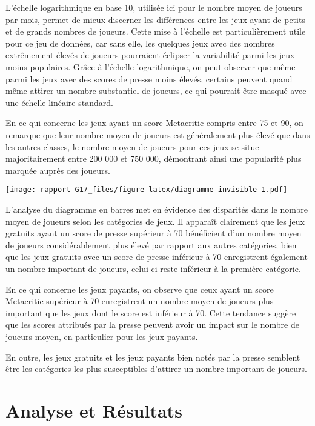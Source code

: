 \documentclass[mstat,12pt]{unswthesis}
\begin{document}
L'échelle logarithmique en base 10, utilisée ici pour le nombre moyen de
joueurs par mois, permet de mieux discerner les différences entre les
jeux ayant de petits et de grands nombres de joueurs. Cette mise à
l'échelle est particulièrement utile pour ce jeu de données, car sans
elle, les quelques jeux avec des nombres extrêmement élevés de joueurs
pourraient éclipser la variabilité parmi les jeux moins populaires.
Grâce à l'échelle logarithmique, on peut observer que même parmi les
jeux avec des scores de presse moins élevés, certains peuvent quand même
attirer un nombre substantiel de joueurs, ce qui pourrait être masqué
avec une échelle linéaire standard.

En ce qui concerne les jeux ayant un score Metacritic compris entre 75
et 90, on remarque que leur nombre moyen de joueurs est généralement
plus élevé que dans les autres classes, le nombre moyen de joueurs pour
ces jeux se situe majoritairement entre 200 000 et 750 000, démontrant
ainsi une popularité plus marquée auprès des joueurs. \newpage

\texttt{[image: rapport-G17\_files/figure-latex/diagramme invisible-1.pdf]}
\bigskip

L'analyse du diagramme en barres met en évidence des disparités dans le
nombre moyen de joueurs selon les catégories de jeux. Il apparaît
clairement que les jeux gratuits ayant un score de presse supérieur à 70
bénéficient d'un nombre moyen de joueurs considérablement plus élevé par
rapport aux autres catégories, bien que les jeux gratuits avec un score
de presse inférieur à 70 enregistrent également un nombre important de
joueurs, celui-ci reste inférieur à la première catégorie.

En ce qui concerne les jeux payants, on observe que ceux ayant un score
Metacritic supérieur à 70 enregistrent un nombre moyen de joueurs plus
important que les jeux dont le score est inférieur à 70. Cette tendance
suggère que les scores attribués par la presse peuvent avoir un impact
sur le nombre de joueurs moyen, en particulier pour les jeux payants.

En outre, les jeux gratuits et les jeux payants bien notés par la presse
semblent être les catégories les plus susceptibles d'attirer un nombre
important de joueurs. \newpage

\hypertarget{analyse-et-ruxe9sultats}{%
\chapter{Analyse et Résultats}\label{analyse-et-ruxe9sultats}}
\end{document}
